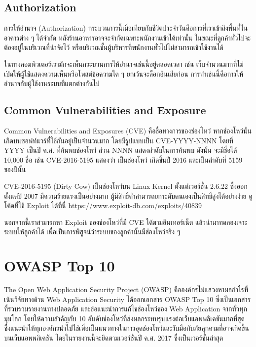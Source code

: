 \subsection{Authorization}

การให้อำนาจ (Authorization) กระบวนการนี้เมื่อเทียบกับชีวิตประจำวันคือการที่เราเข้าถึงพื้นที่ในอาคารต่าง ๆ ได้จำกัด หลังร้านอาหารอาจจะจำกัดเฉพาะพนักงานเข้าได้เท่านั้น ในขณะที่ลูกค้าทั่วไปจะต้องอยู่ในบริเวณที่น่าจัดไว้ หรือบริเวณชั้นผู้บริหารที่พนักงานทั่วไปไม่สามารถเข้าใช้งานได้ 

ในทางคอมพิวเตอร์เรามักจะเห็นกระบวนการให้อำนาจเช่นนี้อยู่ตลอดเวลา เช่น เว็บจำนวนมากที่ไม่เปิดให้ผู้ใช้แสดงความเห็นหรือโพสต์ข้อความใด ๆ ยกเว้นจะล็อกอินเสียก่อน การทำเช่นนี้คือการให้อำนาจกับผู้ใช้งานระบบที่แตกต่างกันไป

\subsection{Common Vulnerabilities and Exposure} \label{cve}

Common Vulnerabilities and Exposures (CVE) \cite{https://cve.mitre.org/} คือชื่อทางการของช่องโหว่ หากช่องโหว่นั้นเกิดบนซอฟท์แวร์ที่ใช้กันอยู่เป็นจำนวนมาก โดยมีรูปแบบเป็น CVE-YYYY-NNNN โดยที่ YYYY เป็นปี ค.ศ. ที่ค้นพบช่องโหว่ ส่วน NNNN แสดงลำดับในการค้นพบ ดังนั้น จะมีชื่อได้ 10,000 ชื่อ เช่น CVE-2016-5195  \cite{https://dirtycow.ninja/} แสดงว่า เป็นช่องโหว่ เกิดขึ้นปี 2016 และเป็นลำดับที่ 5159 ของปีนั้น

CVE-2016-5195 (Dirty Cow) เป็นช่องโหว่บน Linux Kernel ตั้งแต่เวอร์ชั่น 2.6.22 ซึ่งออกตั้งแต่ปี 2007 มีความร้ายแรงเป็นอย่างมาก ผู้มีสิทธิ์ต่ำสามารถยกระดับตนเองเป็นสิทธิ์สูงได้อย่างง่าย ดูโค้ดที่ใช้ Exploit ได้ที่นี่ https://www.exploit-db.com/exploits/40839

นอกจากนี้เราสามารถหา Exploit ของช่องโหว่ที่มี CVE ได้ตามอินเทอร์เน็ต แล้วนำมาทดลองเจาะระบบให้ลูกค้าได้ เพื่อเป็นการพิสูจน์ว่าระบบของลูกค้านั้นมีช่องโหว่จริง ๆ

\section{OWASP Top 10}

The Open Web Application Security Project (OWASP) คือองค์กรไม่แสวงหาผลกำไรที่เน้นวิจัยทางด้าน Web Application Security ได้ออกเอกสาร OWASP Top 10 ซึ่งเป็นเอกสารที่รวบรวมรายงานทางปลอดภัย และข้อแนะนำการแก้ไขช่องโหว่ของ Web Application จากทั่วทุกมุมโลก โดยให้ความสำคัญกับ 10 อันดับช่องโหว่ที่ส่งผลกระทบรุนแรงต่อเว็บแอพพลิเคชันมากที่สุด ซึ่งแนะนำให้ทุกองค์กรนำไปใช้เพื่อเป็นแนวทางในการอุดช่องโหว่และรับมือกับภัยคุกคามที่อาจเกิดขึ้นบนเว็บแอพพลิเคชัน โดยในรายงานนี้จะยึดตามเวอร์ชั่นปี ค.ศ. 2017 ซึ่งเป็นเวอร์ชั่นล่าสุด \cite{???}

